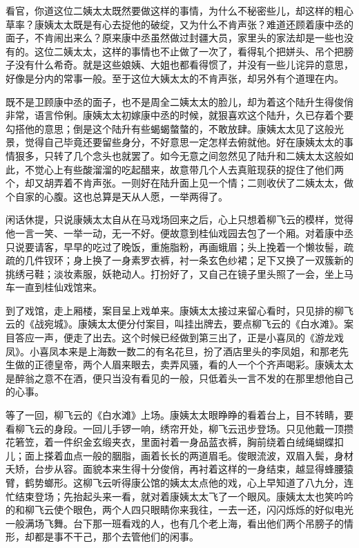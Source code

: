 \documentclass[12pt,UTF8]{ctexbook}
\begin{document}
{{{看官，你道这位二姨太太既然要做这样的事情，为什么不秘密些儿，却这样的粗心草率？康姨太太既是有心去捉他的破绽，又为什么不肯声张？难道还顾着康中丞的面子，不肯闹出来么？原来康中丞虽然做过封疆大员，家里头的家法却是一些也没有的。这位二姨太太，这样的事情也不止做了一次了，看得轧个把姘头、吊个把膀子没有什么希奇。就是这些娘姨、大姐也都看得惯了，并没有一些儿诧异的意思，好像是分内的常事一般。至于这位大姨太太的不肯声张，却另外有个道理在内。

既不是卫顾康中丞的面子，也不是周全二姨太太的脸儿，却为着这个陆升生得俊俏非常，语言伶俐。康姨太太初嫁康中丞的时候，就狠喜欢这个陆升，久已存着个要勾搭他的意思；倒是这个陆升有些蝎蝎螫螫的，不敢放肆。康姨太太见了这般光景，觉得自己毕竟还要留些身分，不好意思一定怎样去俯就他。好在康姨太太的事情狠多，只转了几个念头也就罢了。如今无意之间忽然见了陆升和二姨太太这般如此，不觉心上有些酸溜溜的吃起醋来，故意带几个人去真赃现获的捉住了他们两个，却又胡弄着不肯声张。一则好在陆升面上见一个情；二则收伏了二姨太太，做个自家的心腹。这也总算是天从人愿，一举两得了。

闲话休提，只说康姨太太自从在马戏场回来之后，心上只想着柳飞云的模样，觉得他一言一笑、一举一动，无一不好。便故意到桂仙戏园去包了一个厢。对着康中丞只说要请客，早早的吃过了晚饭，重施脂粉，再画蛾眉；头上挽着一个懒妆髻，疏疏的几件钗环；身上换了一身素罗衣裤，衬一条玄色纱裙；足下又换了一双簇新的挑绣弓鞋；淡妆素服，妖艳动人。打扮好了，又自己在镜子里头照了一会，坐上马车一直到桂仙戏馆来。

到了戏馆，走上厢楼，案目呈上戏单来。康姨太太接过来留心看时，只见排的柳飞云的《战宛城》。康姨太太便分付案目，叫挂出牌去，要点柳飞云的《白水滩》。案目答应一声，便走了出去。这个时候已经做到第三出了，正是小喜凤的《游龙戏凤》。小喜凤本来是上海数一数二的有名花旦，扮了酒店里头的李凤姐，和那老先生做的正德皇帝，两个人眉来眼去，卖弄风骚，看的人一个个齐声喝彩。康姨太太是醉翁之意不在酒，便只当没有看见的一般，只低着头一言不发的在那里想他自己的心事。

等了一回，柳飞云的《白水滩》上场。康姨太太眼睁睁的看着台上，目不转睛，要看柳飞云的身段。一回儿手锣一响，绣帘开处，柳飞云迅步登场。只见他戴一顶攒花箬笠，着一件织金玄缎夹衣，里面衬着一身品蓝衣裤，胸前绕着白绒绳蝴蝶扣儿；面上搽着血点一般的胭脂，画着长长的两道眉毛。俊眼流波，双眉入鬓，身材夭矫，台步从容。面貌本来生得十分俊俏，再衬着这样的一身结束，越显得蜂腰猿臂，鹤势螂形。这柳飞云听得康公馆的姨太太点他的戏，心上早知道了八九分，连忙结束登场；先抬起头来一看，就对着康姨太太飞了一个眼风。康姨太太也笑吟吟的和柳飞云使个眼色，两个人四只眼睛你来我往，一去一还，闪闪烁烁的好似电光一般满场飞舞。台下那一班看戏的人，也有几个老上海，看出他们两个吊膀子的情形，却都是事不干己，那个去管他们的闲事。

}}}
\end{document}
